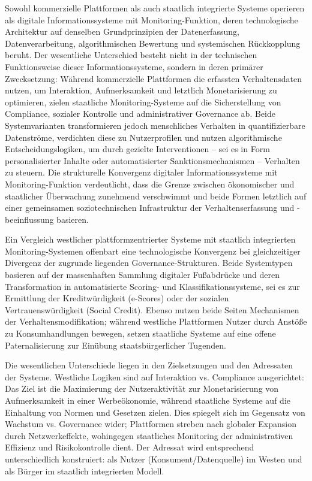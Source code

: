 Sowohl kommerzielle Plattformen als auch staatlich integrierte Systeme operieren als digitale Informationssysteme mit Monitoring-Funktion, deren technologische Architektur auf denselben Grundprinzipien der Datenerfassung, Datenverarbeitung, algorithmischen Bewertung und systemischen Rückkopplung beruht. Der wesentliche Unterschied besteht nicht in der technischen Funktionsweise dieser Informationssysteme, sondern in deren primärer Zwecksetzung: Während kommerzielle Plattformen die erfassten Verhaltensdaten nutzen, um Interaktion, Aufmerksamkeit und letztlich Monetarisierung zu optimieren, zielen staatliche Monitoring-Systeme auf die Sicherstellung von Compliance, sozialer Kontrolle und administrativer Governance ab. Beide Systemvarianten transformieren jedoch menschliches Verhalten in quantifizierbare Datenströme, verdichten diese zu Nutzerprofilen und nutzen algorithmische Entscheidungslogiken, um durch gezielte Interventionen -- sei es in Form personalisierter Inhalte oder automatisierter Sanktionsmechanismen -- Verhalten zu steuern. Die strukturelle Konvergenz digitaler Informationssysteme mit Monitoring-Funktion verdeutlicht, dass die Grenze zwischen ökonomischer und staatlicher Überwachung zunehmend verschwimmt und beide Formen letztlich auf einer gemeinsamen soziotechnischen Infrastruktur der Verhaltenserfassung und -beeinflussung basieren.

Ein Vergleich westlicher plattformzentrierter Systeme mit staatlich integrierten Monitoring-Systemen offenbart eine technologische Konvergenz bei gleichzeitiger Divergenz der zugrunde liegenden Governance-Strukturen. Beide Systemtypen basieren auf der massenhaften Sammlung digitaler Fußabdrücke und deren Transformation in automatisierte Scoring- und Klassifikationssysteme, sei es zur Ermittlung der Kreditwürdigkeit (e-Scores) oder der sozialen Vertrauenswürdigkeit (Social Credit). Ebenso nutzen beide Seiten Mechanismen der Verhaltensmodifikation; während westliche Plattformen Nutzer durch Anstöße zu Konsumhandlungen bewegen, setzen staatliche Systeme auf eine offene Paternalisierung zur Einübung staatsbürgerlicher Tugenden.

Die wesentlichen Unterschiede liegen in den Zielsetzungen und den Adressaten der Systeme. Westliche Logiken sind auf Interaktion vs. Compliance ausgerichtet: Das Ziel ist die Maximierung der Nutzeraktivität zur Monetarisierung von Aufmerksamkeit in einer Werbeökonomie, während staatliche Systeme auf die Einhaltung von Normen und Gesetzen zielen. Dies spiegelt sich im Gegensatz von Wachstum vs. Governance wider; Plattformen streben nach globaler Expansion durch Netzwerkeffekte, wohingegen staatliches Monitoring der administrativen Effizienz und Risikokontrolle dient. Der Adressat wird entsprechend unterschiedlich konstruiert: als Nutzer (Konsument/Datenquelle) im Westen und als Bürger im staatlich integrierten Modell.

